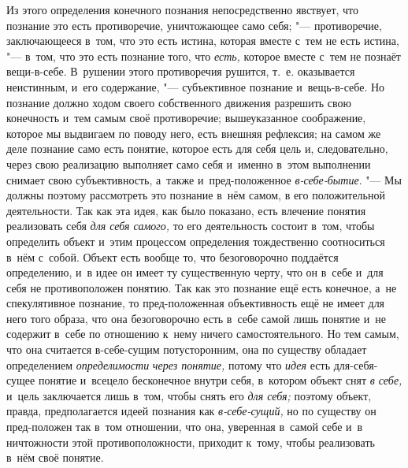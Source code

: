 Из этого определения конечного познания непосредственно
явствует, что познание это есть противоречие, уничтожающее само себя;
"--- противоречие, заключающееся в~том, что это есть истина,
которая вместе с~тем не есть истина, "--- в~том, что это есть
познание того, что {\em есть,}
которое вместе с~тем не познаёт вещи-в-себе. В~рушении этого
противоречия рушится, т.~е. оказывается неистинным, и~его содержание, "---
субъективное познание и~вещь-в-себе. Но познание должно ходом
своего собственного движения разрешить свою конечность и~тем самым своё
противоречие; вышеуказанное соображение, которое мы выдвигаем по поводу
него, есть внешняя рефлексия; на самом же деле познание само есть понятие,
которое есть для себя цель и, следовательно, через свою реализацию
выполняет само себя и~именно в~этом выполнении снимает свою субъективность,
а~также и~пред-положенное
{\em в-себе-бытие}.
"--- Мы должны поэтому рассмотреть это познание в~нём самом, в
его положительной деятельности. Так как эта идея, как было показано, есть
влечение понятия реализовать себя
{\em для себя самого,} то
его деятельность состоит в~том, чтобы определить объект и~этим процессом
определения тождественно соотноситься в~нём с~собой. Объект есть вообще то,
что безоговорочно поддаётся определению, и~в идее он имеет ту существенную
черту, что он в~себе и~для себя не противоположен понятию. Так как это
познание ещё есть конечное, а~не спекулятивное познание, то пред-положенная
объективность ещё не имеет для него того образа, что она безоговорочно есть
в~себе самой лишь понятие и~не содержит в~себе по отношению к~нему ничего
самостоятельного. Но тем самым, что она считается в-себе-сущим
потусторонним, она по существу обладает определением
{\em определимости}
{\em через понятие,}
потому что {\em идея}
есть для-себя-сущее понятие и~всецело бесконечное внутри
себя, в~котором объект снят {\em в
себе,} и~цель заключается лишь в~том, чтобы снять его
{\em для себя;} поэтому
объект, правда, предполагается идеей познания как
{\em в-себе-сущий,} но по
существу он пред-положен так в~том отношении, что она,
уверенная в~самой себе и~в ничтожности этой
противоположности, приходит к~тому, чтобы реализовать в~нём своё понятие.

